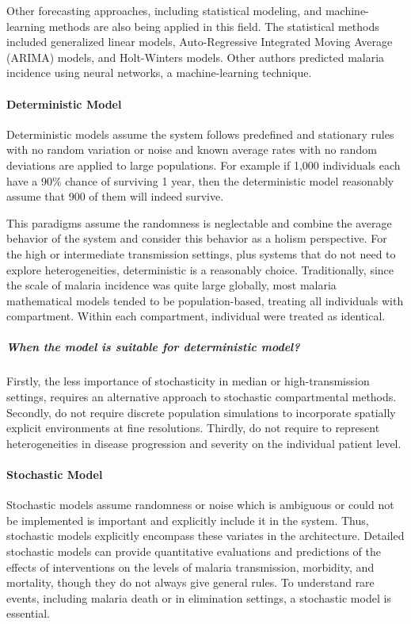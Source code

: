 \documentclass[a4paper, 12pt, twoside]{article}
\begin{document}
Other forecasting approaches, including statistical modeling, and machine-learning methods are also being applied in this field.
The statistical methods included generalized linear models, Auto-Regressive Integrated Moving Average (ARIMA) models\cite{box2015time,Anokye2018}, and Holt-Winters models\cite{Chatfield1978}.
Other authors\cite{Toh2021a,Libbrecht2015,Nkiruka2021,Verma2020,Kim2019,Khameneh2014,Ebhuoma2018,Hancock2020} predicted malaria incidence using neural networks, a machine-learning technique.

\paragraph{Deterministic Model}%
\label{par:deterministic_model}

Deterministic models assume the system follows predefined and stationary rules with no random variation or noise and known average rates with no random deviations are applied to large populations.
For example if 1,000 individuals each have a 90\% chance of surviving 1 year, then the deterministic model reasonably assume that 900 of them will indeed survive.

This paradigms assume the randomness is neglectable and combine the average behavior of the system and consider this behavior as a holism perspective.
For the high or intermediate transmission settings, plus systems that do not need to explore heterogeneities, deterministic is a reasonably choice. 
Traditionally, since the scale of malaria incidence was quite large globally, most malaria mathematical models tended to be population-based, treating all individuals with compartment.
Within each compartment, individual were treated as identical.

\subparagraph{When the model is suitable for deterministic model?}%
\label{par:when_the_model_is_suitable_for_deterministic_model_}
Firstly, the less importance of stochasticity in median or high-transmission settings, requires an alternative approach to stochastic compartmental methods.
Secondly, do not require discrete population simulations to incorporate spatially explicit environments at fine resolutions.
Thirdly, do not require to represent heterogeneities in disease progression and severity on the individual patient level.

\paragraph{Stochastic Model}
\label{par:stochastic_model}
Stochastic models assume randomness or noise which is ambiguous or could not be implemented is important and explicitly include it in the system.
Thus, stochastic models explicitly encompass these variates in the architecture.
Detailed stochastic models can provide quantitative evaluations and predictions of the effects of interventions on the levels of malaria transmission, morbidity, and mortality, though they do not always give general rules.
To understand rare events, including malaria death or in elimination settings, a stochastic model is essential.
\end{document}
